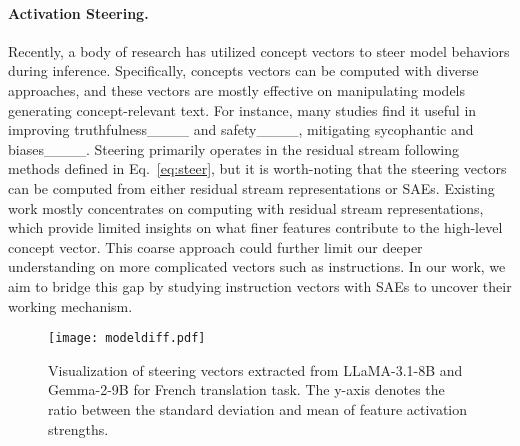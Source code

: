 \paragraph{Activation Steering.}
Recently, a body of research has utilized concept vectors to steer model behaviors during inference. Specifically, concepts vectors can be computed with diverse approaches, and these vectors are mostly effective on manipulating models generating concept-relevant text. For instance, many studies find it useful in improving truthfulness____ and safety____, mitigating sycophantic and biases____. Steering primarily operates in the residual stream following methods defined in Eq.~\eqref{eq:steer}, but it is worth-noting that the steering vectors can be computed from either residual stream representations or SAEs. Existing work mostly concentrates on computing with residual stream representations, which provide limited insights on what finer features contribute to the high-level concept vector. This coarse approach could further limit our deeper understanding on more complicated vectors such as instructions. In our work, we aim to bridge this gap by studying instruction vectors with SAEs to uncover their working mechanism.


\begin{figure}[tb]
    \centering
    \texttt{[image: modeldiff.pdf]}
    \caption{Visualization of steering vectors extracted from LLaMA-3.1-8B and Gemma-2-9B for French translation task. The y-axis denotes the ratio between the standard deviation and mean of feature activation strengths.}
    \label{fig:cross-model}
\end{figure}